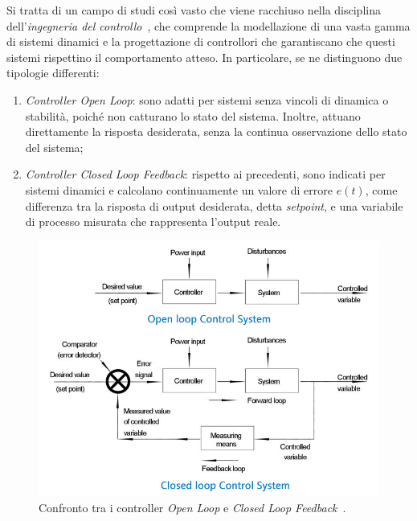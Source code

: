 Si tratta di un campo di studi così vasto che viene racchiuso nella disciplina 
dell'\textit{ingegneria del controllo}~\cite{f1tenthcoursel04}, che comprende la modellazione 
di una vasta gamma di sistemi dinamici e la progettazione di controllori che garantiscano che 
questi sistemi rispettino il comportamento atteso. In particolare, se ne distinguono due tipologie differenti:
\begin{enumerate}
    \item \textit{Controller Open Loop}: sono adatti per sistemi senza vincoli di dinamica o 
    stabilità, poiché non catturano lo stato del sistema. Inoltre, attuano direttamente la risposta desiderata, senza la continua osservazione dello stato del sistema;
    \item \textit{Controller Closed Loop Feedback}: rispetto ai precedenti, sono indicati per 
    sistemi dinamici e calcolano continuamente un valore di errore $e(t)$, come differenza
    tra la risposta di output desiderata, detta \textit{setpoint}, e una variabile di processo 
    misurata che rappresenta l'output reale.
\end{enumerate}

\begin{figure}[H]
    \centering
    \includegraphics[width=\textwidth]{images/compare_open_closed_loop.jpg}
    \caption{Confronto tra i controller \textit{Open Loop} e \textit{Closed Loop Feedback}~\cite{diffcontrollers}.}
    \label{fig:fig6} %
\end{figure}

